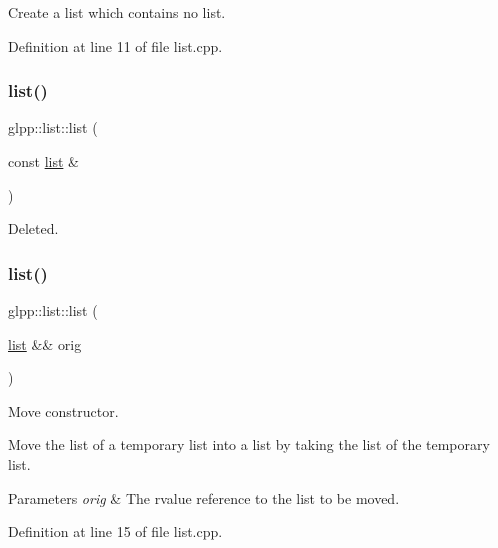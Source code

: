 Create a list which contains no list. 



Definition at line 11 of file list.\+cpp.

\mbox{\label{classglpp_1_1list_a55814bd10129c619115f95bbebef7197}} 
\subsubsection{\texorpdfstring{list()}{list()}\hspace{0.1cm}{\footnotesize\ttfamily [2/3]}}
{\footnotesize\ttfamily glpp\+::list\+::list (\begin{DoxyParamCaption}\item[{const \hyperlink{classglpp_1_1list}{list} \&}]{ }\end{DoxyParamCaption})\hspace{0.3cm}{\ttfamily [delete]}}

Deleted. \mbox{\label{classglpp_1_1list_ab5287a3d79b3ebb25da54a5f01d1edff}} 
\subsubsection{\texorpdfstring{list()}{list()}\hspace{0.1cm}{\footnotesize\ttfamily [3/3]}}
{\footnotesize\ttfamily glpp\+::list\+::list (\begin{DoxyParamCaption}\item[{\hyperlink{classglpp_1_1list}{list} \&\&}]{orig }\end{DoxyParamCaption})\hspace{0.3cm}{\ttfamily [noexcept]}}



Move constructor. 

Move the list of a temporary list into a list by taking the list of the temporary list.


\begin{DoxyParams}{Parameters}
{\em orig} & The rvalue reference to the list to be moved. \\
\hline
\end{DoxyParams}


Definition at line 15 of file list.\+cpp.

